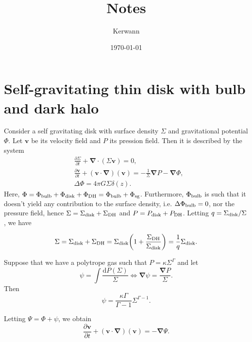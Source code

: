 \documentclass[11pt]{article}
\author{Kerwann}
\date{\today}
\title{Notes}
\newcommand{\bv}{\boldsymbol{v}}
\newcommand{\bnab}{\boldsymbol{\nabla}}
\newcommand{\rd}{\mathrm{d}}
\newcommand{\Sigmad}{\Sigma_{\rm{disk}}}
\newcommand{\Sigmadh}{\Sigma_{\rm{DH}}}
\newcommand{\Phib}{\Phi_{\rm{bulb}}}
\newcommand{\Phid}{\Phi_{\rm{disk}}}
\newcommand{\Phidh}{\Phi_{\rm{DH}}}
\newcommand{\Phisg}{\Phi_{\rm{sg}}}
\begin{document}
\maketitle

\tableofcontents


\section{Self-gravitating thin disk with bulb and dark halo}
\label{sec:sg_disk}

Consider a self gravitating disk with surface density $\Sigma$ and gravitational potential $\Phi$. Let $\bv$ be its velocity field and $P$ its pression field. Then it is described by the system
\begin{align}
&\frac{\partial \Sigma}{\partial t} + \bnab \cdot (\Sigma \bv) = 0 ,\\
&\frac{\partial \bv}{\partial t} + (\bv \cdot \bnab)(\bv) = -\frac{1}{\Sigma} \bnab P - \bnab \Phi ,\\
& \Delta \Phi = 4\pi G \Sigma \delta (z).
\end{align}
Here, $\Phi =\Phib+  \Phid +  \Phidh=\Phib +  \Phisg$. Furthermore, $\Phib$  is such that it doesn't yield any contribution to the surface density, i.e. $\Delta \Phib=0$, nor the pressure field, hence $\Sigma =\Sigmad+\Sigmadh$ and $P =P_{\rm{disk}}+P_{\rm{DH}}$. Letting $q=\Sigmad/\Sigma$, we have

\begin{equation}
\Sigma=\Sigmad+\Sigma_{\rm{DH}}=\Sigmad\bigg(1+\frac{\Sigmadh}{\Sigmad}\bigg) =\frac{1}{q} \Sigmad.
\end{equation}

Suppose that we have a polytrope gas such that $P=\kappa \Sigma^{\Gamma}$ and let
\begin{equation}
\psi = \int \frac{\rd P(\Sigma)}{\Sigma} \Leftrightarrow \bnab \psi = \frac{\bnab P}{\Sigma}.
\end{equation}
 Then
 \begin{equation}
\psi = \frac{\kappa \Gamma}{\Gamma-1} \Sigma^{\Gamma-1}.
\end{equation}
 
 Letting $\Psi = \Phi + \psi$, we obtain
\begin{equation}
\frac{\partial \bv}{\partial t} + (\bv \cdot \bnab)(\bv) = - \bnab \Psi.
\end{equation}
\end{document}
